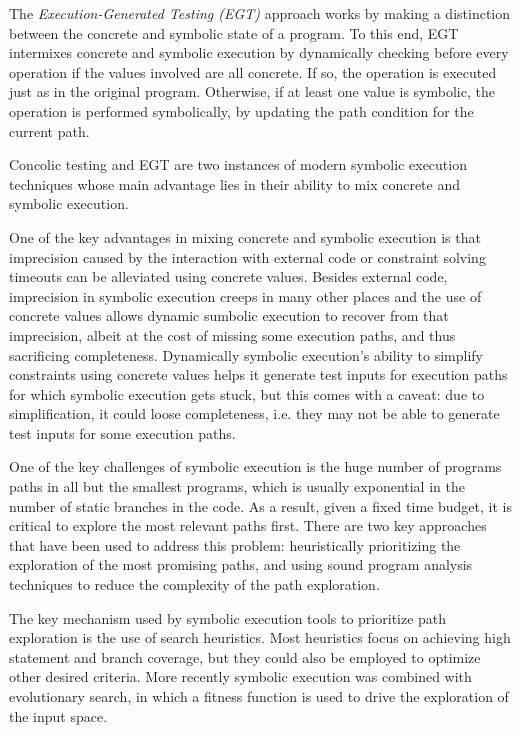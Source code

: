 The \textit{Execution-Generated Testing (EGT)} approach works by making a distinction between the concrete and symbolic state of a program. To this end, EGT intermixes concrete and symbolic execution by dynamically checking before every operation if the values involved are all concrete. If so, the operation is executed just as in the original program. Otherwise, if at least one value is symbolic, the operation is performed symbolically, by updating the path condition for the current path.

Concolic testing and EGT are two instances of modern symbolic execution techniques whose main advantage lies in their ability to mix concrete and symbolic execution.

One of the key advantages in mixing concrete and symbolic execution is that imprecision caused by the interaction with external code or constraint solving timeouts can be alleviated using concrete values.
Besides external code, imprecision in symbolic execution creeps in many other places and the use of concrete values allows dynamic sumbolic execution to recover from that imprecision, albeit at the cost of missing some execution paths, and thus sacrificing completeness. Dynamically symbolic execution's ability to simplify constraints using concrete values helps it generate test inputs for execution paths for which symbolic execution gets stuck, but this comes with a caveat: due to simplification, it could loose completeness, i.e. they may not be able to generate test inputs for some execution paths.

One of the key challenges of symbolic execution is the huge number of programs paths in all but the smallest programs, which is usually exponential in the number of static branches in the code. As a result, given a fixed time budget, it is critical to explore the most relevant paths first.
There are two key approaches that have been used to address this problem: heuristically prioritizing the exploration of the most promising paths, and using sound program analysis techniques to reduce the complexity of the path exploration.

The key mechanism used by symbolic execution tools to prioritize path exploration is the use of search heuristics. Most heuristics focus on achieving high statement and branch coverage, but they could also be employed to optimize other desired criteria.
More recently symbolic execution was combined with evolutionary search, in which a fitness function is used to drive the exploration of the input space.

